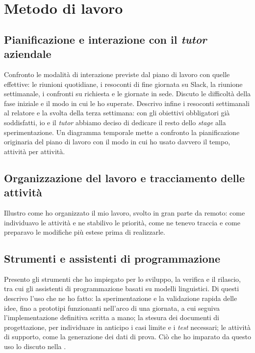 
\section{Metodo di lavoro}

\subsection{Pianificazione e interazione con il \emph{tutor} aziendale}

Confronto le modalità di interazione previste dal piano di lavoro con quelle effettive: le riunioni
quotidiane, i resoconti di fine giornata su Slack, la riunione settimanale, i confronti su richiesta
e le giornate in sede. Discuto le difficoltà della fase iniziale e il modo in cui le ho superate.
Descrivo infine i resoconti settimanali al relatore e la svolta della terza settimana: con gli
obiettivi obbligatori già soddisfatti, io e il \emph{tutor} abbiamo deciso di dedicare il resto
dello \emph{stage} alla sperimentazione. Un diagramma temporale mette a confronto la pianificazione
originaria del piano di lavoro con il modo in cui ho usato davvero il tempo, attività per attività.

\subsection{Organizzazione del lavoro e tracciamento delle attività}

Illustro come ho organizzato il mio lavoro, svolto in gran parte da remoto: come individuavo le
attività e ne stabilivo le priorità, come ne tenevo traccia e come preparavo le modifiche più estese
prima di realizzarle.

\subsection{Strumenti e assistenti di programmazione}

Presento gli strumenti che ho impiegato per lo sviluppo, la verifica e il rilascio, tra cui gli
assistenti di programmazione basati su modelli linguistici. Di questi descrivo l’uso che ne ho
fatto: la sperimentazione e la validazione rapida delle idee, fino a prototipi funzionanti nell’arco
di una giornata, a cui seguiva l’implementazione definitiva scritta a mano; la stesura dei documenti
di progettazione, per individuare in anticipo i casi limite e i \emph{test} necessari; le attività
di supporto, come la generazione dei dati di prova. Ciò che ho imparato da questo uso lo discuto
nella .
